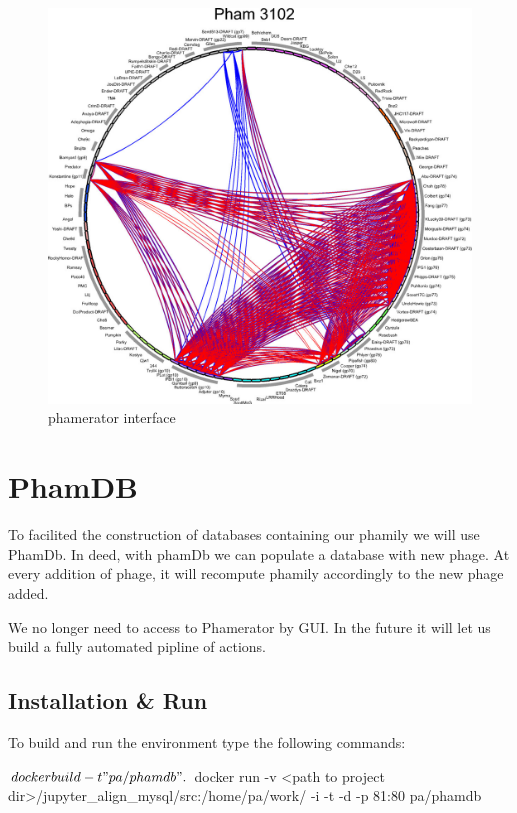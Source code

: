 \documentclass[a4paper,11pt]{report}
\begin{document}
\begin{figure}[H] 
	\begin{center}
		\includegraphics[scale=0.45]{img/12859_2011_Article_4954_Fig8_HTML}
		\caption{phamerator interface}
	\end{center}
\end{figure}

\section{PhamDB}
To facilited the construction of databases containing our phamily we will use PhamDb. In deed, with phamDb we can populate a database with new phage. At every addition of phage, it will recompute phamily accordingly to the new phage added. 

We no longer need to access to Phamerator by GUI. In the future it will let us build a fully automated pipline of actions.

\subsection{Installation \& Run}
To build and run the environment type the following commands:
\begin{javacode}
$ docker build -t "pa/phamdb" .
$ docker run -v <path to project dir>/jupyter_align_mysql/src:/home/pa/work/ -i -t -d -p 81:80 pa/phamdb
\end{javacode}
\end{document}
